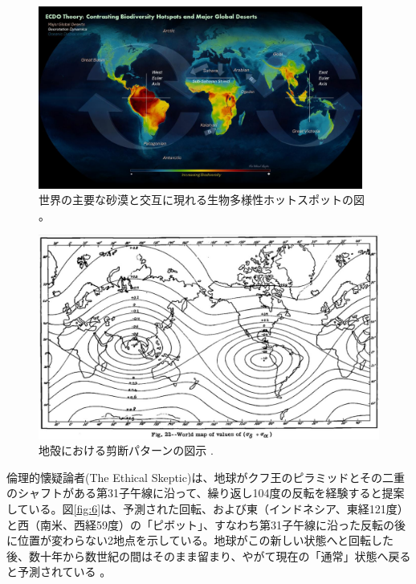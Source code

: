 \documentclass[10pt,twocolumn,letterpaper]{article}
\begin{document}
\begin{figure}[t]
\begin{center}
\includegraphics[width=0.95\textwidth]{biodiversity.jpg}
\end{center}
   \caption{世界の主要な砂漠と交互に現れる生物多様性ホットスポットの図 \cite{28}。}
\label{fig:9}
\end{figure}

\begin{figure}[t]
\begin{center}
   \includegraphics[width=1\linewidth]{meinesz3.jpg}
\end{center}
   \caption{地殻における剪断パターンの図示 \cite{36}.}
\label{fig:8}

\label{fig:onecol}
\end{figure}

倫理的懐疑論者(The Ethical Skeptic)は、地球がクフ王のピラミッドとその二重のシャフトがある第31子午線に沿って、繰り返し104度の反転を経験すると提案している。図\ref{fig:6}は、予測された回転、および東（インドネシア、東経121度）と西（南米、西経59度）の「ピボット」、すなわち第31子午線に沿った反転の後に位置が変わらない2地点を示している。地球がこの新しい状態へと回転した後、数十年から数世紀の間はそのまま留まり、やがて現在の「通常」状態へ戻ると予測されている \cite{150}。
\end{document}
